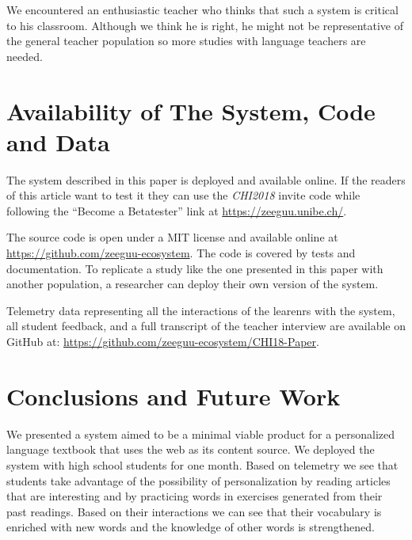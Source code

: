 We encountered an enthusiastic teacher who thinks that such a system is critical to his classroom. Although we think he is right, he might not be representative of the general teacher population so more studies with language teachers are needed.


\section{Availability of The System, Code and Data}

The system described in this paper is deployed and available online. If the readers of this article want to test it they can use the {\em CHI2018} invite code while following the  ``Become a Betatester'' link at \url{https://zeeguu.unibe.ch/}.

The source code is open under a MIT license and available online at \url{https://github.com/zeeguu-ecosystem}. The code is covered by tests and documentation. To replicate a study like the one presented in this paper with another population, a researcher can deploy their own version of the system. 

Telemetry data representing all the interactions of the learenrs with the system, all student feedback, and a full transcript of the teacher interview are available on GitHub at: \url{https://github.com/zeeguu-ecosystem/CHI18-Paper}. 





\section{Conclusions and Future Work}
We presented a system aimed to be a minimal viable product for a personalized language textbook that uses the web as its content source. We deployed the system with \studs high school students for one month. 
Based on telemetry we see that students take advantage of the possibility of personalization by 
  reading articles that are interesting and 
  by practicing words in exercises generated from their past readings. 
Based on their interactions we can see that their vocabulary is enriched with new words and the knowledge of other words is strengthened.

